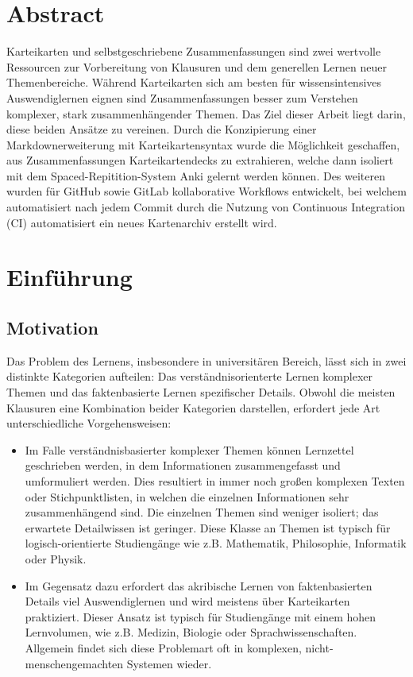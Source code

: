 \documentclass[ngerman]{article}
\begin{document}
\maketitle
\section*{Abstract}
Karteikarten und selbstgeschriebene Zusammenfassungen sind zwei wertvolle Ressourcen zur Vorbereitung von Klausuren und dem generellen Lernen neuer Themenbereiche. Während Karteikarten sich am besten für wissensintensives Auswendiglernen eignen sind Zusammenfassungen besser zum Verstehen komplexer, stark zusammenhängender Themen. Das Ziel dieser Arbeit liegt darin, diese beiden Ansätze zu vereinen. Durch die Konzipierung einer Markdownerweiterung mit Karteikartensyntax wurde die Möglichkeit geschaffen, aus Zusammenfassungen Karteikartendecks zu extrahieren, welche dann isoliert mit dem Spaced-Repitition-System Anki gelernt werden können. Des weiteren wurden für GitHub sowie GitLab kollaborative Workflows entwickelt, bei welchem automatisiert nach jedem Commit durch die Nutzung von Continuous Integration (CI) automatisiert ein neues Kartenarchiv erstellt wird.
\tableofcontents
\newpage


\section{Einführung}
\subsection{Motivation}
Das Problem des Lernens, insbesondere in universitären Bereich, lässt sich in zwei distinkte Kategorien aufteilen: Das verständnisorienterte Lernen komplexer Themen und das faktenbasierte Lernen spezifischer Details. Obwohl die meisten Klausuren eine Kombination beider Kategorien darstellen, erfordert jede Art unterschiedliche Vorgehensweisen:

\begin{itemize}
\item Im Falle verständnisbasierter komplexer Themen können Lernzettel geschrieben werden, in dem Informationen zusammengefasst und umformuliert werden. Dies resultiert in immer noch großen komplexen Texten oder Stichpunktlisten, in welchen die einzelnen Informationen sehr zusammenhängend sind. Die einzelnen Themen sind weniger isoliert; das erwartete Detailwissen ist geringer. Diese Klasse an Themen ist typisch für logisch-orientierte Studiengänge wie z.B. Mathematik, Philosophie, Informatik oder Physik.
\item Im Gegensatz dazu erfordert das akribische Lernen von faktenbasierten Details viel Auswendiglernen und wird meistens über Karteikarten praktiziert. Dieser Ansatz ist typisch für Studiengänge mit einem hohen Lernvolumen, wie z.B. Medizin, Biologie oder Sprachwissenschaften. Allgemein findet sich diese Problemart oft in komplexen, nicht-menschengemachten Systemen wieder.
\end{itemize}
\end{document}
